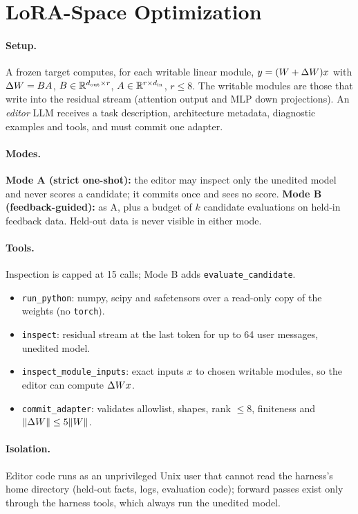 \section{LoRA-Space Optimization}
\label{sec:method}

\paragraph{Setup.} A frozen target computes, for each writable linear module, $y=(W+\Delta W)x$ with
$\Delta W=BA$, $B\in\mathbb{R}^{d_{\text{out}}\times r}$, $A\in\mathbb{R}^{r\times d_{\text{in}}}$, $r\le 8$. The writable modules are those
that write into the residual stream (attention output and MLP down projections). An \emph{editor} LLM receives a task
description, architecture metadata, diagnostic examples and tools, and must commit one adapter.

\paragraph{Modes.} \textbf{Mode A (strict one-shot):} the editor may inspect only the unedited model and never scores a
candidate; it commits once and sees no score. \textbf{Mode B (feedback-guided):} as A, plus a budget of $k$
candidate evaluations on held-in feedback data. Held-out data is never visible in either mode.

\paragraph{Tools.} Inspection is capped at 15 calls; Mode B adds \texttt{evaluate\_candidate}.
\begin{itemize}[leftmargin=*,itemsep=1pt]
  \item \texttt{run\_python}: numpy, scipy and safetensors over a read-only copy of the weights (no \texttt{torch}).
  \item \texttt{inspect}: residual stream at the last token for up to 64 user messages, unedited model.
  \item \texttt{inspect\_module\_inputs}: exact inputs $x$ to chosen writable modules, so the editor can compute
        $\Delta W x$.
  \item \texttt{commit\_adapter}: validates allowlist, shapes, rank $\le 8$, finiteness and
        $\lVert\Delta W\rVert\le 5\lVert W\rVert$.
\end{itemize}

\paragraph{Isolation.} Editor code runs as an unprivileged Unix user that cannot read the harness's home directory
(held-out facts, logs, evaluation code); forward passes exist only through the harness tools, which always run the
unedited model. 

